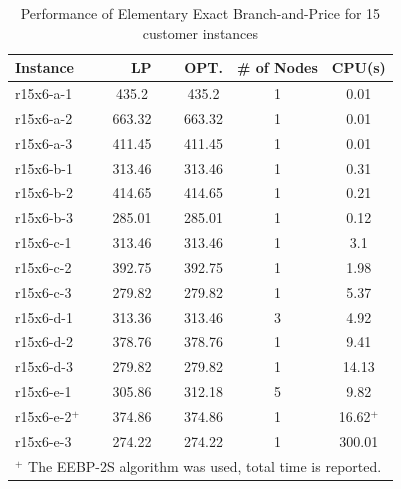 \begin{table}[ht]
\centering
\caption{Performance of Elementary Exact Branch-and-Price for 15 customer instances}\label{gr2-15}
\begin {tabular}[t]{|l|c|c|c|c|}  
\hline
Instance & LP & OPT. & \# of Nodes & CPU(s) \\\hline
r15x6-a-1 \ \	&	435.2 \ \	&	435.2	&	1	&	0.01	\\
r15x6-a-2 \ \	&	663.32 \ \	&	663.32	&	1	&	0.01	\\
r15x6-a-3 \ \	&	411.45 \ \	&	411.45	&	1	&	0.01	\\
r15x6-b-1 \ \	&	313.46 \ \	&	313.46	&	1	&	0.31	\\
r15x6-b-2 \ \	&	414.65 \ \	&	414.65	&	1	&	0.21	\\
r15x6-b-3 \ \	&	285.01 \ \	&	285.01	&	1	&	0.12	\\
r15x6-c-1 \ \	&	313.46 \ \	&	313.46	&	1	&	3.1	\\
r15x6-c-2 \ \	&	392.75 \ \	&	392.75	&	1	&	1.98	\\
r15x6-c-3 \ \	&	279.82 \ \	&	279.82	&	1	&	5.37	\\
r15x6-d-1 \ \	&	313.36 \ \	&	313.46	&	3	&	4.92	\\
r15x6-d-2 \ \	&	378.76 \ \	&	378.76	&	1	&	9.41	\\
r15x6-d-3 \ \	&	279.82 \ \	&	279.82	&	1	&	14.13	\\
r15x6-e-1 \ \	&	305.86 \ \	&	312.18	&	5	&	9.82	\\
r15x6-e-2$^+$ \ \	&	374.86 \ \	&	374.86	&	1	&	16.62$^+$	\\
r15x6-e-3 \ \	&	274.22	 \ \ &	274.22	&	1	&	300.01	\\
\hline
\multicolumn{5}{l}{$^+$ The EEBP-2S algorithm was used, total time is reported.}\\
\end{tabular}
\end{table} 

